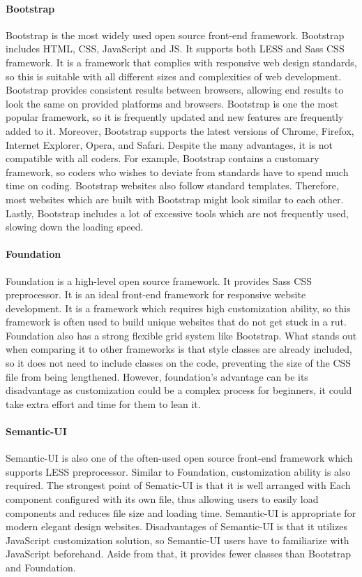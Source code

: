\documentclass[10pt]{article}
\begin{document}
            \paragraph{Bootstrap}
                Bootstrap is the most widely used open source front-end framework. Bootstrap includes HTML, CSS, JavaScript and JS. It supports both LESS and Sass CSS framework. It is a framework that complies with responsive web design standards, so this is suitable with all different sizes and complexities of web development. Bootstrap provides consistent results between browsers, allowing end results to look the same on provided platforms and browsers. Bootstrap is one the most popular framework, so it is frequently updated and new features are frequently added to it. Moreover, Bootstrap supports the latest versions of Chrome, Firefox, Internet Explorer, Opera, and Safari. Despite the many advantages, it is not compatible with all coders. For example, Bootstrap contains a customary framework, so coders who wishes to deviate from standards have to spend much time on coding. Bootstrap websites also follow standard templates. Therefore, most websites which are built with Bootstrap might look similar to each other. Lastly, Bootstrap includes a lot of excessive tools which are not frequently used, slowing down the loading speed.

            \paragraph{Foundation}
                Foundation is a high-level open source framework. It provides Sass CSS preprocessor. It is an ideal front-end framework for responsive website development. It is a framework which requires high customization ability, so this framework is often used to build unique websites that do not get stuck in a rut. Foundation also has a strong flexible grid system like Bootstrap. What stands out when comparing it to other frameworks is that style classes are already included, so it does not need to include classes on the code, preventing the size of the CSS file from being lengthened. However, foundation’s advantage can be its disadvantage as customization could be a complex process for beginners, it could take extra effort and time for them to lean it.

            \paragraph{Semantic-UI}
                Semantic-UI is also one of the often-used open source front-end framework which supports LESS preprocessor. Similar to Foundation, customization ability is also required. The strongest point of Sematic-UI is that it is well arranged with Each component configured with its own file, thus allowing users to easily load components and reduces file size and loading time. Semantic-UI is appropriate for modern elegant design websites. Disadvantages of Semantic-UI is that it utilizes JavaScript customization solution, so Semantic-UI users have to familiarize with JavaScript beforehand. Aside from that, it provides fewer classes than Bootstrap and Foundation.
\end{document}
